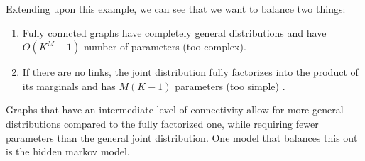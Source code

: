 \documentclass{article}
\begin{document}
      Extending upon this example, we can see that we want to balance two things: 
      \begin{enumerate} 
        \item Fully conncted graphs have completely general distributions and have $O(K^M -1)$ number of parameters (too complex). 
        \item If there are no links, the joint distribution fully factorizes into the product of its marginals and has $M(K-1)$ parameters (too simple) . 
      \end{enumerate}
      Graphs that have an intermediate level of connectivity allow for more general distributions compared to the fully factorized one, while requiring fewer parameters than the general joint distribution. One model that balances this out is the hidden markov model. 
\end{document}
